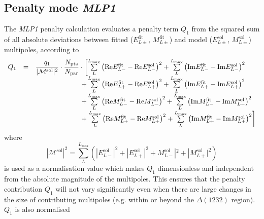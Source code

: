 \documentclass[a4paper,10pt]{article}
\def\Re{\mathrm{Re}}
\def\Im{\mathrm{Im}}
\begin{document}
\subsection{Penalty mode \textit{MLP1}}

The \textit{MLP1} penalty calculation evaluates a penalty term $Q_1$ from the squared sum of all absolute deviations
between fitted 
(${E}_{L\pm}^\mathrm{fit}$, ${M}_{L\pm}^\mathrm{fit}$)
and model
(${E}_{L\pm}^\mathrm{sol}$, ${M}_{L\pm}^\mathrm{sol}$)
multipoles, according to
\begin{displaymath}
\begin{array}{lcl}
 Q_1 &=& \dfrac{q_1}{|\mathcal{M}^\mathrm{sol}|^2}\cdot \dfrac{N_\mathrm{pts}}{N_\mathrm{par}} \cdot \left[
\sum\limits_L^{L_\mathrm{max}}\left(\Re E_{L-}^\mathrm{fit} - \Re E_{L-}^\mathrm{sol}\right)^2
+
\sum\limits_L^{L_\mathrm{max}}\left(\Im E_{L-}^\mathrm{fit} - \Im E_{L-}^\mathrm{sol}\right)^2\right.\\
&&\hspace{6.73em}+
\sum\limits_L^{L_\mathrm{max}}\left(\Re E_{L+}^\mathrm{fit} - \Re E_{L+}^\mathrm{sol}\right)^2
+
\sum\limits_L^{L_\mathrm{max}}\left(\Im E_{L+}^\mathrm{fit} - \Im E_{L+}^\mathrm{sol}\right)^2\\
&&\hspace{6.73em}+
\sum\limits_L^{L_\mathrm{max}}\left(\Re M_{L-}^\mathrm{fit} - \Re M_{L-}^\mathrm{sol}\right)^2
+
\sum\limits_L^{L_\mathrm{max}}\left(\Im M_{L-}^\mathrm{fit} - \Im M_{L-}^\mathrm{sol}\right)^2\\
&&\hspace{6.73em}+\left.
\sum\limits_L^{L_\mathrm{max}}\left(\Re M_{L+}^\mathrm{fit} - \Re M_{L+}^\mathrm{sol}\right)^2
+
\sum\limits_L^{L_\mathrm{max}}\left(\Im M_{L+}^\mathrm{fit} - \Im M_{L+}^\mathrm{sol}\right)^2
\right]
\end{array}
\end{displaymath}
where
\begin{displaymath}
 |\mathcal{M}^\mathrm{sol}|^2 = \sum\limits_L^{L_\mathrm{max}}
\left(|E_{L-}^\mathrm{sol}|^2 + |E_{L+}^\mathrm{sol}|^2 + M_{L-}^\mathrm{sol}|^2 + |M_{L+}^\mathrm{sol}|^2\right)
\end{displaymath}
is used as a normalisation value which makes $Q_1$ dimensionless and independent from the absolute magnitude of the multipoles.
This ensures that the penalty contribution $Q_1$ will not vary significantly even when there are large changes in the size of
contributing multipoles (e.g. within or beyond the $\Delta(1232)$ region). $Q_1$ is also normalised
\end{document}

